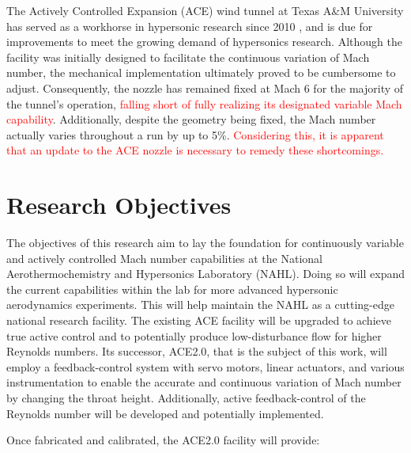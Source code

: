 The Actively Controlled Expansion (ACE) wind tunnel at Texas A\&M University has served as a workhorse in hypersonic research since 2010 \cite{ace09,ace10-calibrate,tichenor-dis,aceturb,mai-dis,neel-dis,leidy-dis}, and is due for improvements to meet the growing demand of hypersonics research. Although the facility was initially designed to facilitate the continuous variation of Mach number, the mechanical implementation ultimately proved to be cumbersome to adjust. Consequently, the nozzle has remained fixed at Mach 6 for the majority of the tunnel's operation, \textcolor{red}{falling short of fully realizing its designated variable Mach capability}. Additionally, despite the geometry being fixed, the Mach number actually varies throughout a run by up to 5\%. \textcolor{red}{Considering this, it is apparent that an update to the ACE nozzle is necessary to remedy these shortcomings.}

\section{Research Objectives}

The objectives of this research aim to lay the foundation for continuously variable and actively controlled Mach number capabilities at the National Aerothermochemistry and Hypersonics Laboratory (NAHL). Doing so will expand the current capabilities within the lab for more advanced hypersonic aerodynamics experiments. This will help maintain the NAHL as a cutting-edge national research facility. The existing ACE facility will be upgraded to achieve true active control and to potentially produce low-disturbance flow for higher Reynolds numbers. Its successor, ACE2.0, that is the subject of this work, will employ a feedback-control system with servo motors, linear actuators, and various instrumentation to enable the accurate and continuous variation of Mach number by changing the throat height. Additionally, active feedback-control of the Reynolds number will be developed and potentially implemented. 

Once fabricated and calibrated, the ACE2.0 facility will provide:

